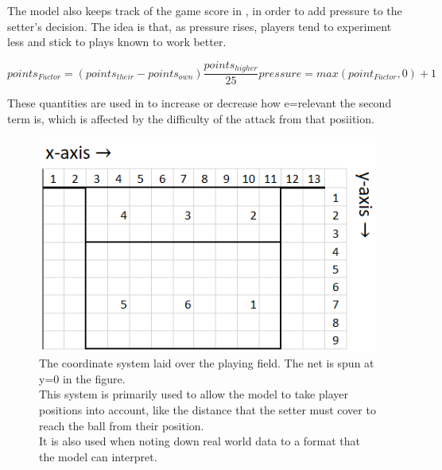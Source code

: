 \documentclass[main.tex]{subfiles}
\begin{document}
      The model also keeps track of the game score in , in order to add pressure to the setter's decision. The idea is that, as pressure rises, players tend to experiment less and stick to plays known to work better.
    
      \begin{subequations}
        \begin{equation}
          points_{Factor}=(points_{their} - points_{own})\frac{points_{higher}}{25} 
          \label{equ:points}
        \end{equation}
        \begin{equation}
          pressure= max( point_{Factor}, 0) + 1      
          \label{equ:pressure}
        \end{equation}
        \label{equ:score}
      \end{subequations}
      
      These quantities are used in  to increase or decrease how e=relevant the second term is, which is affected by the difficulty of the attack from that posiition.
      
      \begin{figure}
        \centering
        \includegraphics[width=0.4\linewidth]{figures/playingFieldGridLabelled}
        \caption{The coordinate system laid over the playing field. The net is spun at y=0 in the figure. \\
          This system is primarily used to allow the model to take player positions into account, like the distance that the setter must cover to reach the ball from their position. \\
          It is also used when noting down real world data to a format that the model can interpret.}
        \label{fig:field}
      \end{figure}
    
\end{document}
